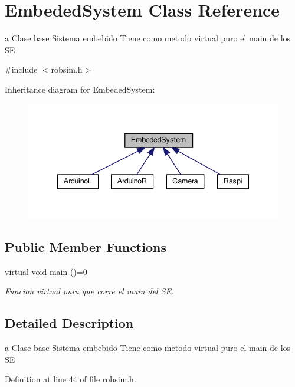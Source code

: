 \hypertarget{classEmbededSystem}{}\section{Embeded\+System Class Reference}
\label{classEmbededSystem}


a Clase base Sistema embebido Tiene como metodo virtual puro el main de los SE  




{\ttfamily \#include $<$robsim.\+h$>$}



Inheritance diagram for Embeded\+System\+:\nopagebreak
\begin{figure}[H]
\begin{center}
\leavevmode
\includegraphics[width=340pt]{classEmbededSystem__inherit__graph}
\end{center}
\end{figure}
\subsection*{Public Member Functions}
\begin{DoxyCompactItemize}
\item 
virtual void \hyperlink{classEmbededSystem_a3a333d4954af4068f5e97301b4f55c48}{main} ()=0
\begin{DoxyCompactList}\small\item\em Funcion virtual pura que corre el main del SE. \end{DoxyCompactList}\end{DoxyCompactItemize}


\subsection{Detailed Description}
a Clase base Sistema embebido Tiene como metodo virtual puro el main de los SE 

Definition at line 44 of file robsim.\+h.



